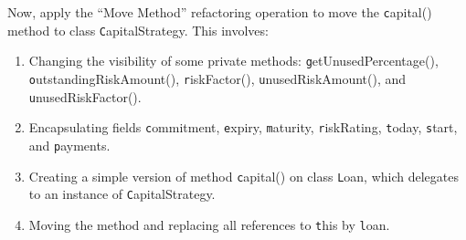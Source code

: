 \documentclass[a4paper,11pt]{memoir}
\newcommand{\code}[1]{{\texttt #1}}
\begin{document}
\begin{exercise}
Now, apply the ``Move Method'' refactoring operation to move the \code{capital()} method to class \code{CapitalStrategy}.  This involves:

\begin{enumerate}
	\item Changing the visibility of some private methods: \code{getUnusedPercentage()}, \code{outstandingRiskAmount()}, \code{riskFactor()}, \code{unusedRiskAmount()}, and \code{unusedRiskFactor()}.
	\item Encapsulating fields \code{commitment}, \code{expiry}, \code{maturity}, \code{riskRating}, \code{today}, \code{start}, and \code{payments}.
	\item Creating a simple version of method \code{capital()} on class \code{Loan}, which delegates to an instance of \code{CapitalStrategy}.
	\item Moving the method and replacing all references to \code{this} by \code{loan}.
\end{enumerate}

\end{exercise}
\end{document}
